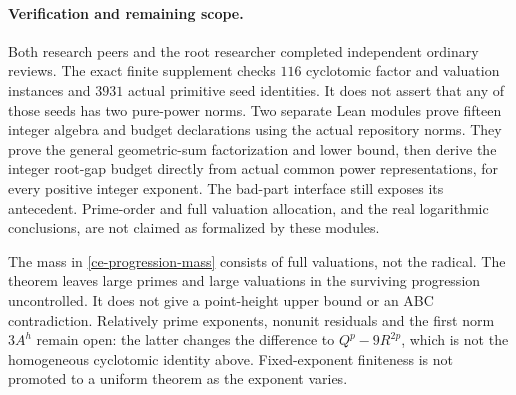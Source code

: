 \paragraph{Verification and remaining scope.}
Both research peers and the root researcher completed independent
ordinary reviews. The exact finite supplement checks $116$
cyclotomic factor and valuation instances and $3931$ actual primitive
seed identities. It does not assert that any of those seeds has two
pure-power norms. Two separate Lean modules prove fifteen integer
algebra and budget declarations using the actual repository norms.
They prove the general geometric-sum factorization and lower bound,
then derive the integer root-gap budget directly from actual common
power representations, for every positive integer exponent. The
bad-part interface still exposes its antecedent. Prime-order and full
valuation allocation, and the real logarithmic conclusions, are not
claimed as formalized by these modules.

The mass in \eqref{ce-progression-mass} consists of full valuations,
not the radical. The theorem leaves large primes and large valuations
in the surviving progression uncontrolled. It does not give a point-height
upper bound or an ABC contradiction. Relatively prime exponents,
nonunit residuals and the first norm $3A^h$ remain open: the latter
changes the difference to $Q^p-9R^{2p}$, which is not the homogeneous
cyclotomic identity above. Fixed-exponent finiteness is not promoted
to a uniform theorem as the exponent varies.
